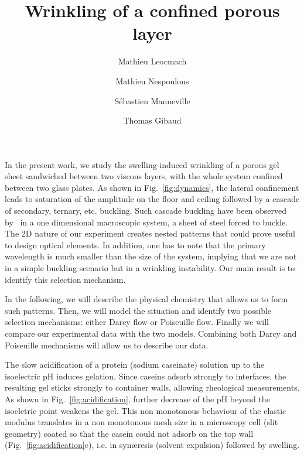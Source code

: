 \documentclass[twocolumn,superscriptaddress,showpacs,preprintnumbers,amsmath,amssymb,prl]{revtex4-1}
\begin{document}
\title{Wrinkling of a confined porous layer}
\author{Mathieu Leocmach}
\author{Mathieu Nespoulous}
\author{Sébastien Manneville}
\author{Thomas Gibaud}

\begin{abstract}

\end{abstract}

\maketitle

In the present work, we study the swelling-induced wrinkling of a porous gel sheet sandwiched between two viscous layers, with the whole system confined between two glass plates. As shown in Fig.~\ref{fig:dynamics}, the lateral confinement leads to saturation of the amplitude on the floor and ceiling followed by a cascade of secondary, ternary, etc. buckling. Such cascade buckling have been observed by~\cite{Roman1999} in a one dimensional macroscopic system, a sheet of steel forced to buckle. The 2D nature of our experiment creates nested patterns that could prove useful to design optical elements. In addition, one has to note that the primary wavelength is much smaller than the size of the system, implying that we are not in a simple buckling scenario but in a wrinkling instability. Our main result is to identify this selection mechanism.


In the following, we will describe the physical chemistry that allows us to form such patterns. Then, we will model the situation and identify two possible selection mechanisms: either Darcy flow or Poiseuille flow. Finally we will compare our experimental data with the two models. Combining both Darcy and Poiseuille mechanisms will allow us to describe our data.


The slow acidification of a protein (sodium caseinate) solution up to the isoelectric pH induces gelation. Since caseins adsorb strongly to interfaces, the resulting gel sticks strongly to container walls, allowing rheological measurements. As shown in Fig.~\ref{fig:acidification}, further decrease of the pH beyond the isoeletric point weakens the gel. This non monotonous behaviour of the elastic modulus translates in a non monotonous mesh size in a microscopy cell (slit geometry) coated so that the casein could not adsorb on the top wall (Fig.~\ref{fig:acidification}c), i.e. in syn\ae{}resis (solvent expulsion) followed by swelling.
\end{document}
